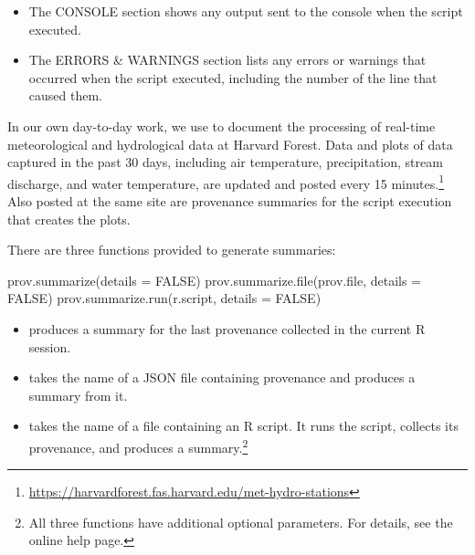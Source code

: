 \begin{itemize}

\item The CONSOLE section shows any output sent to the console when the script executed.

\item The ERRORS \& WARNINGS section lists any errors or warnings that occurred when the script executed, including the number of the line that caused them.
\end{itemize}


In our own day-to-day work, we use  to document the processing of real-time meteorological and hydrological data at Harvard Forest. Data and plots of data captured in the past 30 days, including air temperature, precipitation, stream discharge, and water temperature, are updated and posted every 15 minutes.\footnote{\url{https://harvardforest.fas.harvard.edu/met-hydro-stations}} Also posted at the same site are provenance summaries for the script execution that creates the plots.

There are three functions provided to generate summaries:
\begin{example}
prov.summarize(details = FALSE)
prov.summarize.file(prov.file, details = FALSE)
prov.summarize.run(r.script, details = FALSE)
\end{example}
\begin{itemize}
\item {} produces a summary for the last provenance collected in the current R session.
\item {} takes the name of a JSON file containing provenance and produces a summary from it.
\item {} takes the name of a file containing an R script.  It runs the script, collects its provenance, and produces a summary.\footnote{All three functions have additional optional parameters.  For details, see the online help page.}
\end{itemize}

